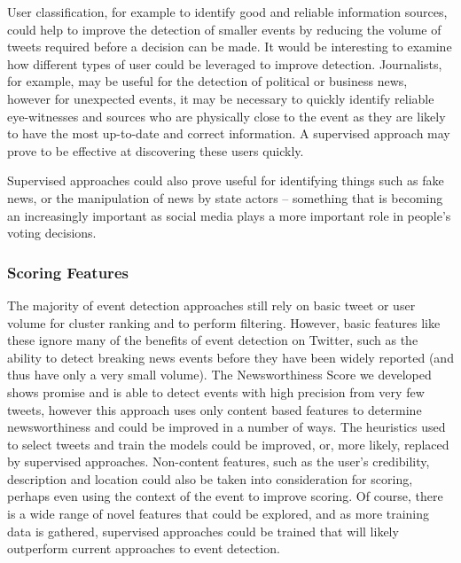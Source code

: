 User classification, for example to identify good and reliable information sources, could help to improve the detection of smaller events by reducing the volume of tweets required before a decision can be made.
It would be interesting to examine how different types of user could be leveraged to improve detection.
Journalists, for example, may be useful for the detection of political or business news, however for unexpected events, it may be necessary to quickly identify reliable eye-witnesses and sources who are physically close to the event as they are likely to have the most up-to-date and correct information.
A supervised approach may prove to be effective at discovering these users quickly.

Supervised approaches could also prove useful for identifying things such as fake news, or the manipulation of news by state actors -- something that is becoming an increasingly important as social media plays a more important role in people's voting decisions.


\subsubsection{Scoring Features}
The majority of event detection approaches still rely on basic tweet or user volume for cluster ranking and to perform filtering.
However, basic features like these ignore many of the benefits of event detection on Twitter, such as the ability to detect breaking news events before they have been widely reported (and thus have only a very small volume).
The Newsworthiness Score we developed shows promise and is able to detect events with high precision from very few tweets, however this approach uses only content based features to determine newsworthiness and could be improved in a number of ways.
The heuristics used to select tweets and train the models could be improved, or, more likely, replaced by supervised approaches.
Non-content features, such as the user's credibility, description and location could also be taken into consideration for scoring, perhaps even using the context of the event to improve scoring.
Of course, there is a wide range of novel features that could be explored, and as more training data is gathered, supervised approaches could be trained that will likely outperform current approaches to event detection.

